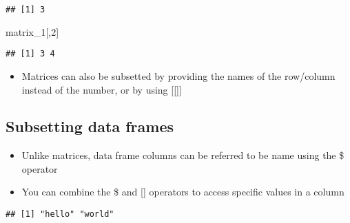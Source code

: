 \documentclass[]{article}
\newenvironment{Shaded}{\begin{snugshade}}{\end{snugshade}}
\newcommand{\KeywordTok}[1]{\textcolor[rgb]{0.13,0.29,0.53}{\textbf{#1}}}
\newcommand{\DataTypeTok}[1]{\textcolor[rgb]{0.13,0.29,0.53}{#1}}
\newcommand{\DecValTok}[1]{\textcolor[rgb]{0.00,0.00,0.81}{#1}}
\newcommand{\StringTok}[1]{\textcolor[rgb]{0.31,0.60,0.02}{#1}}
\newcommand{\OtherTok}[1]{\textcolor[rgb]{0.56,0.35,0.01}{#1}}
\newcommand{\OperatorTok}[1]{\textcolor[rgb]{0.81,0.36,0.00}{\textbf{#1}}}
\newcommand{\NormalTok}[1]{#1}
\providecommand{\tightlist}{%
  \setlength{\itemsep}{0pt}\setlength{\parskip}{0pt}}
\begin{document}
\begin{verbatim}
## [1] 3
\end{verbatim}

\begin{Shaded}
\begin{Highlighting}[]
\NormalTok{matrix_}\DecValTok{1}\NormalTok{[,}\DecValTok{2}\NormalTok{]}
\end{Highlighting}
\end{Shaded}

\begin{verbatim}
## [1] 3 4
\end{verbatim}

\begin{itemize}
\tightlist
\item
  Matrices can also be subsetted by providing the names of the
  row/column instead of the number, or by using {[}{[}{]}{]}
\end{itemize}

\subsection{Subsetting data frames}\label{subsetting-data-frames}

\begin{itemize}
\tightlist
\item
  Unlike matrices, data frame columns can be referred to be name using
  the \$ operator
\item
  You can combine the \$ and {[}{]} operators to access specific values
  in a column
\end{itemize}

\begin{Shaded}
\end{Shaded}

\begin{verbatim}
## [1] "hello" "world"
\end{verbatim}
\end{document}
